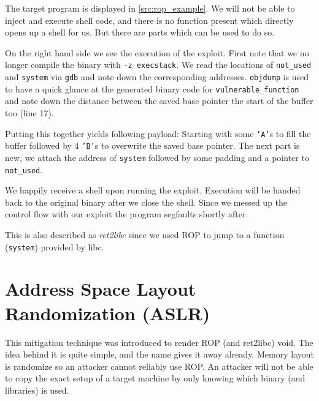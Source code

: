 \documentclass[article]{uibk}
\begin{document}
The target program is displayed in \cref{src:rop_example}. We will not be able
to inject and execute shell code, and there is no function present which
directly opens up a shell for us. But there are parts which can be used to do
so.

On the right hand side we see the execution of the exploit. First note that we
no longer compile the binary with \texttt{-z execstack}. We read the locations
of \texttt{not\_used} and \texttt{system} via \texttt{gdb} and note down the
corresponding addresses. \texttt{objdump} is used to have a quick glance at the
generated binary code for \texttt{vulnerable\_function} and note down the
distance between the saved base pointer the start of the buffer too (line 17).

Putting this together yields following payload: Starting with some
\texttt{'A'}s to fill the buffer followed by 4 \texttt{'B'}s to overwrite the
saved base pointer. The next part is new, we attach the address of
\texttt{system} followed by some padding and a pointer to \texttt{not\_used}.

We happily receive a shell upon running the exploit. Execution will be handed
back to the original binary after we close the shell. Since we messed up the
control flow with our exploit the program segfaults shortly after.

This is also described as \textit{ret2libc} since we used ROP to jump to a
function (\texttt{system}) provided by libc.

\section{Address Space Layout Randomization (ASLR)}

This mitigation technique was introduced to render ROP (and ret2libc) void. The
idea behind it is quite simple, and the name gives it away already. Memory
layout is randomize so an attacker cannot reliably use ROP. An attacker will
not be able to copy the exact setup of a target machine by only knowing which
binary (and libraries) is used.
\end{document}
